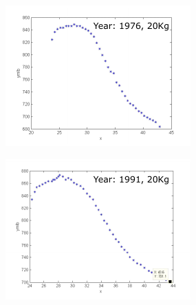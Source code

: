 \begin{figure}[ht]
    \centering
    \begin{subfigure}{0.45\textwidth}
        \centering
        \includegraphics[width=\linewidth]{Chapters/2CHP/Diagrams/g1line.pdf}
        \caption{}
        \label{subfig:g1lines}
    \end{subfigure}
    \begin{subfigure}{0.45\textwidth}
        \centering
        \includegraphics[width=\linewidth]{Chapters/2CHP/Diagrams/g2line.pdf}
        \caption{}
        \label{subfig:g2lines}
    \end{subfigure}
    \begin{subfigure}{0.45\textwidth}

\end{subfigure}
\end{figure}
